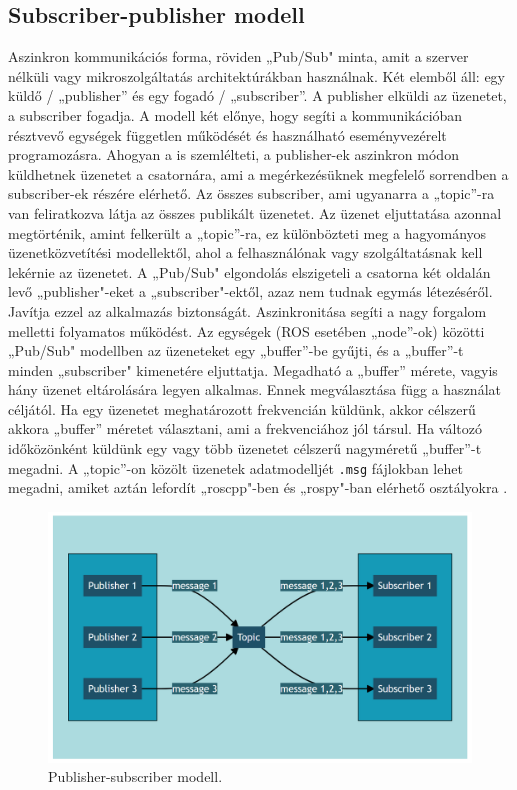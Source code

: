 \subsection{Subscriber-publisher modell}
\label{sec:ros_sp1}
Aszinkron kommunikációs forma, röviden „Pub/Sub" minta, amit a szerver nélküli vagy mikroszolgáltatás architektúrákban használnak. Két elemből áll: egy küldő / „publisher” és egy fogadó / „subscriber”. A publisher elküldi az üzenetet, a subscriber fogadja. A modell két előnye, hogy segíti a kommunikációban résztvevő egységek független működését és használható eseményvezérelt programozásra. Ahogyan a  is szemlélteti, a publisher-ek aszinkron módon küldhetnek üzenetet a csatornára, ami a megérkezésüknek megfelelő sorrendben a subscriber-ek részére elérhető. Az összes subscriber, ami ugyanarra a „topic”-ra van feliratkozva látja az összes publikált üzenetet. Az üzenet eljuttatása azonnal megtörténik, amint felkerült a „topic”-ra, ez különbözteti meg a hagyományos üzenetközvetítési modellektől, ahol a felhasználónak vagy szolgáltatásnak kell lekérnie az üzenetet. A „Pub/Sub" elgondolás elszigeteli a csatorna két oldalán levő „publisher"-eket a „subscriber"-ektől, azaz nem tudnak egymás létezéséről. Javítja ezzel az alkalmazás biztonságát. Aszinkronitása segíti a nagy forgalom melletti folyamatos működést. Az egységek (ROS esetében „node”-ok) közötti „Pub/Sub" modellben az üzeneteket egy „buffer”-be gyűjti, és a „buffer”-t minden „subscriber" kimenetére eljuttatja. Megadható a „buffer” mérete, vagyis hány üzenet eltárolására legyen alkalmas. Ennek megválasztása függ a használat céljától. Ha egy üzenetet meghatározott frekvencián küldünk, akkor célszerű akkora „buffer” méretet választani, ami a frekvenciához jól társul. Ha változó időközönként küldünk egy vagy több üzenetet célszerű nagyméretű „buffer”-t megadni. A „topic”-on közölt üzenetek adatmodelljét \verb|.msg| fájlokban lehet megadni, amiket aztán lefordít „roscpp"-ben és „rospy"-ban elérhető osztályokra \cite{pubsub1}\cite{pubsub2}.
\begin{figure}[!ht]
    \centering
    \includegraphics[width=150mm, keepaspectratio]{02_mermaid/mermaid02_pubsub.png}
    \caption{Publisher-subscriber modell.}
    \label{fig:pubsub}
\end{figure}
 \clearpage
